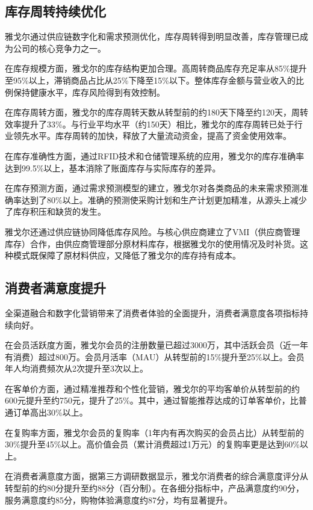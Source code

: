 \documentclass[12pt,a4paper]{article}
\begin{document}
\subsection{库存周转持续优化}

雅戈尔通过供应链数字化和需求预测优化，库存周转得到明显改善，库存管理已成为公司的核心竞争力之一。

在库存规模方面，雅戈尔的库存结构更加合理。高周转商品库存充足率从85\%提升至95\%以上，滞销商品占比从25\%下降至15\%以下。整体库存金额与营业收入的比例保持健康水平，库存风险得到有效控制。

在库存周转方面，雅戈尔的库存周转天数从转型前的约180天下降至约120天，周转效率提升了33\%。与行业平均水平（约150天）相比，雅戈尔的库存周转已处于行业领先水平。库存周转的加快，释放了大量流动资金，提高了资金使用效率。

在库存准确性方面，通过RFID技术和仓储管理系统的应用，雅戈尔的库存准确率达到99.5\%以上，基本消除了账面库存与实际库存的差异。

在库存预测方面，通过需求预测模型的建立，雅戈尔对各类商品的未来需求预测准确率达到了80\%以上。准确的预测使采购计划和生产计划更加精准，从源头上减少了库存积压和缺货的发生。

雅戈尔还通过供应链协同降低库存风险。与核心供应商建立了VMI（供应商管理库存）合作，由供应商管理部分原材料库存，根据雅戈尔的使用情况及时补货。这种模式既保障了原材料供应，又降低了雅戈尔的库存持有成本。

\subsection{消费者满意度提升}

全渠道融合和数字化营销带来了消费者体验的全面提升，消费者满意度各项指标持续向好。

在会员活跃度方面，雅戈尔会员的注册数量已超过3000万，其中活跃会员（近一年有消费）超过800万。会员月活率（MAU）从转型前的15\%提升至25\%以上。会员年人均消费频次从2次提升至3次以上。

在客单价方面，通过精准推荐和个性化营销，雅戈尔的平均客单价从转型前的约600元提升至约750元，提升了25\%。其中，通过智能推荐达成的订单客单价，比普通订单高出30\%以上。

在复购率方面，雅戈尔会员的复购率（1年内有再次购买的会员占比）从转型前的30\%提升至45\%以上。高价值会员（累计消费超过1万元）的复购率更是达到60\%以上。

在消费者满意度方面，据第三方调研数据显示，雅戈尔消费者的综合满意度评分从转型前的约80分提升至约88分（百分制）。在各细分指标中，产品满意度约90分，服务满意度约85分，购物体验满意度约87分，均有显著提升。
\end{document}
